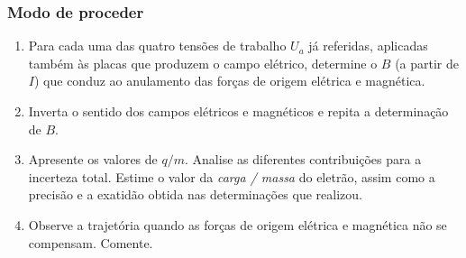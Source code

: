 \documentclass[a4paper,twoside,12pt]{article}      %
\begin{document}
\subsubsection{\sf Modo de proceder}
\begin{enumerate}
	\item Para cada uma das quatro tensões de trabalho $U_a$ já referidas, aplicadas também às placas que produzem o campo elétrico, determine o $B$ (a partir de $I$) que conduz ao anulamento das forças de origem elétrica e magnética.
	\item Inverta o sentido dos campos elétricos e magnéticos e repita a determinação de $B$.
	\item Apresente os valores de $q/m$. Analise as diferentes contribuições para a incerteza total. Estime o valor da \emph{carga / massa } do eletrão, assim como a precisão e a exatidão obtida nas determinações que realizou.
	\item  Observe  a  trajetória  quando  as  forças  de 
origem elétrica e magnética não se compensam. Comente. 
\end{enumerate}
\end{document}
